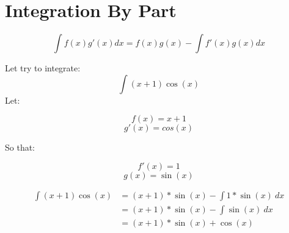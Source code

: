 \section{Integration By Part}
	\begin{equation}
	\int f(x)g'(x) dx = f(x)g(x)-\int f'(x)g(x)dx
	\end{equation}
	
	\begin{simple}{}{}
	Let try to integrate:
	$$\int(x+1)\cos{(x)}$$
	Let:
	
	\begin{multicols}{2}
	\noindent
	\begin{equation*}
	f(x)=x+1
	\end{equation*}
	\begin{equation*}
	g'(x)=cos(x)
	\end{equation*}
	\end{multicols}
	
	\noindent So that:
	
	\begin{multicols}{2}
	\noindent
	\begin{equation*}
	f'(x)=1
	\end{equation*}
	\begin{equation*}
	g(x)=\sin{(x)}
	\end{equation*}
	\end{multicols}
	
	\begin{align*}
	\int (x+1)\cos{(x)} &= (x+1)*\sin{(x)} -\int 1*\sin{(x)}\ dx\\
	&=(x+1)*\sin{(x)} - \int \sin{(x)}\ dx\\
	&=(x+1)*\sin{(x)} + \cos{(x)}\\
	\end{align*}
	\end{simple}
	

